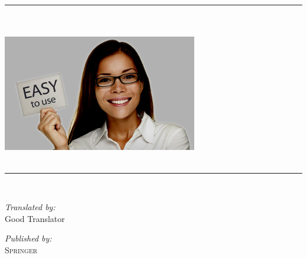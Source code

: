 \newcommand{\HRule}{\rule{\linewidth}{0.5mm}}
\begin{titlepage}
\begin{center}

\HRule \\[0.3cm]
\makeatletter
\textsc{\Large \@author} \\[0.3cm]
\includegraphics[width=8.5cm]{img/coverimg.jpg} \\[0.3cm]
{ \Huge \bfseries \@title} \\%
\makeatother
\HRule \\[0.3cm]

\begin{minipage}{0.4\textwidth}
\begin{flushleft} \small
\emph{Translated by:}\\
Good Translator %
\end{flushleft}
\end{minipage}
\begin{minipage}{0.4\textwidth}
\begin{flushright} \small
\emph{Published by:} \\
\textsc{Springer} %
\end{flushright}
\end{minipage}

\end{center}
\end{titlepage}





